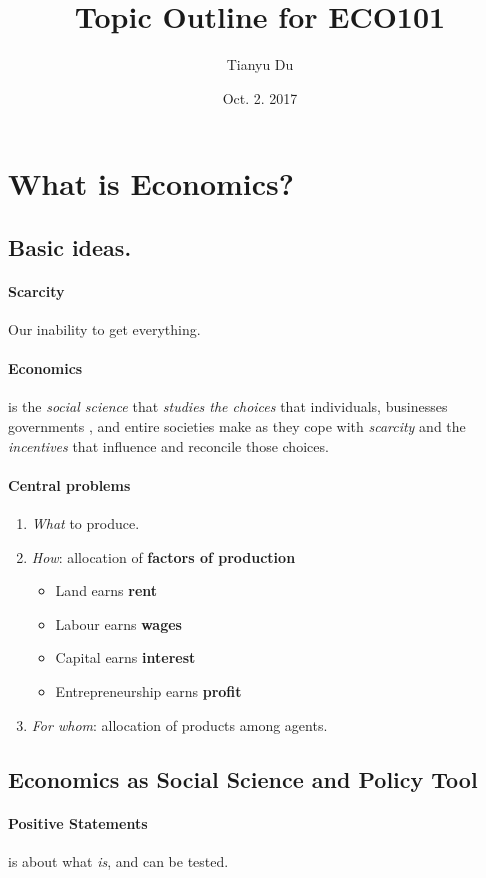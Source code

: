 \documentclass{article}
\author{Tianyu Du}
\date{Oct. 2. 2017}
\title{Topic Outline for ECO101}
\begin{document}
	\maketitle
	\tableofcontents
	\section{What is Economics?}
	\subsection{Basic ideas.}
	\paragraph{Scarcity} Our inability to get everything.
	\paragraph{Economics} is the \emph{social science} that \emph{studies the choices} that individuals, businesses governments , and entire societies make as they cope with \emph{scarcity} and the \emph{incentives} that influence and reconcile those choices.
	\paragraph{Central problems}
	\begin{enumerate}
		\item \emph{What} to produce.
		\item \emph{How}: allocation of \textbf{factors of production}
		\begin{itemize}
			\item Land earns \textbf{rent}
			\item Labour earns \textbf{wages}
			\item Capital earns \textbf{interest}
			\item Entrepreneurship earns \textbf{profit}
		\end{itemize}
		\item \emph{For whom}: allocation of products among agents.
	\end{enumerate}
	\subsection{Economics as Social Science and Policy Tool}
	\paragraph{Positive Statements} is about what \emph{is}, and can be tested.
\end{document}
